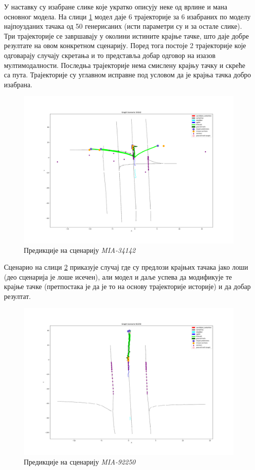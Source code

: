 \documentclass[11pt,oneside]{memoir}
\begin{document}
У наставку су изабране слике које укратко описују неке од врлине и мана основног модела. На слици \ref{tnt-MIA-34142} модел даје
6 трајекторије за 6 изабраних по моделу најпоузданих тачака од 50 генерисаних (исти параметри су и за остале слике). Три трајекторије
се завршавају у околини истините крајње тачке, што даје добре резултате на овом конкретном сценарију. Поред тога постоје
2 трајекторије које одговарају случају скретања и то представља добар одговор на изазов мултимодалности. Последња трајекторије
нема смислену крајњу тачку и скреће са пута. Трајекторије су углавном исправне под условом да је крајња тачка добро изабрана.  

\begin{figure}[H]
  \centering
  \includegraphics[width=1.0\textwidth]{images/MIA_34142.png}
  \caption{Предикције на сценарију \textit{MIA-34142} \label{tnt-MIA-34142}}
\end{figure}

Сценарио на слици \ref{tnt-MIA-92250} приказује случај где су предлози крајњих тачака јако лоши (део сценарија је лоше исечен), али 
модел и даље успева да модификује те крајње тачке (претпостака је да је то на основу трајекторије историје) и да добар резултат.

\begin{figure}[H]
  \centering
  \includegraphics[width=1.0\textwidth]{images/MIA_92250.png}
  \caption{Предикције на сценарију \textit{MIA-92250} \label{tnt-MIA-92250}}
\end{figure}
\end{document}
